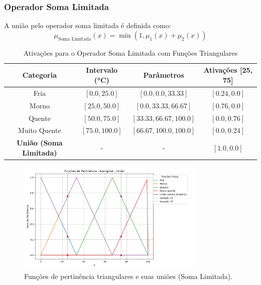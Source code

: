 \documentclass[a4paper,12pt]{article}
\begin{document}
\subsubsection{Operador Soma Limitada}

A união pelo operador soma limitada é definida como:
\[
\mu_{\text{Soma Limitada}}(x) = \min(1, \mu_1(x) + \mu_2(x))
\]

\begin{table}[H]
\centering
\caption{Ativações para o Operador Soma Limitada com Funções Triangulares}
\begin{tabular}{|c|c|c|c|}
\hline
\textbf{Categoria}    & \textbf{Intervalo (°C)} & \textbf{Parâmetros}       & \textbf{Ativações [25, 75]} \\ \hline
Fria                  & $[0.0, 25.0]$          & $[0.0, 0.0, 33.33]$       & $[0.24, 0.0]$              \\ \hline
Morno                 & $[25.0, 50.0]$         & $[0.0, 33.33, 66.67]$     & $[0.76, 0.0]$              \\ \hline
Quente                & $[50.0, 75.0]$         & $[33.33, 66.67, 100.0]$   & $[0.0, 0.76]$              \\ \hline
Muito Quente          & $[75.0, 100.0]$        & $[66.67, 100.0, 100.0]$   & $[0.0, 0.24]$              \\ \hline
\textbf{União (Soma Limitada)} & -            & -                         & $[1.0, 0.0]$             \\ \hline
\end{tabular}
\end{table}

\begin{figure}[H]
    \centering
    \includegraphics[width=0.8\textwidth]{img/funções_de_pertinência_triangular_união_fuzzificado.png}
    \caption{Funções de pertinência triangulares e suas uniões (Soma Limitada).}
    \label{fig:uniao_soma_limitada_triangular}
\end{figure}
\end{document}
